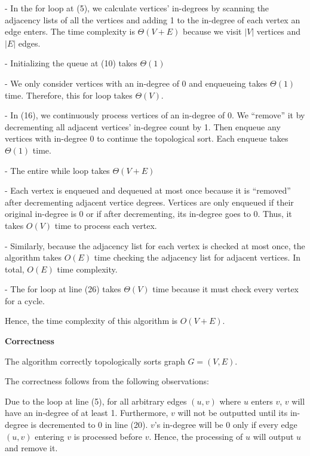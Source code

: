 \documentclass[a4paper]{report}
\begin{document}
\begin{enumerate}
      - In the for loop at (5), we calculate vertices' in-degrees by scanning the adjacency lists of all the vertices and
      adding 1 to the in-degree of each vertex an edge enters. The time complexity is $\Theta(V+E)$ because we visit
      $|V|$ vertices and $|E|$ edges.

      - Initializing the queue at (10) takes $\Theta(1)$

      - We only consider vertices with an in-degree of 0 and enqueueing takes $\Theta(1)$ time. Therefore, this for loop takes
      $\Theta(V)$.

      - In (16), we continuously process vertices of an in-degree of 0. We ``remove'' it by decrementing all adjacent vertices'
      in-degree count by 1. Then enqueue any vertices with in-degree 0 to continue the topological sort. Each enqueue takes
      $\Theta(1)$ time. 

      - The entire while loop takes $\Theta(V+E)$ 
      
        - Each vertex is enqueued and dequeued at most once because it is ``removed'' after decrementing adjacent vertice degrees.
      Vertices are only enqueued if their original in-degree is 0 or if after decrementing, its in-degree goes to 0. Thus, 
      it takes $O(V)$ time to process each vertex.

        - Similarly, because the adjacency list for each vertex is checked at most once, the algorithm takes $O(E)$ time checking
        the adjacency list for adjacent vertices. In total, $O(E)$ time complexity. 

      - The for loop at line (26) takes $\Theta(V)$ time because it must check every vertex for a cycle.

      Hence, the time complexity of this algorithm is $O(V+E)$.

      {\bf Correctness}

      The algorithm correctly topologically sorts graph $G=(V,E)$. 
      
      The correctness follows from the following observations:
      
      Due to the loop at line (5), for all arbitrary edges $(u,v)$ where $u$ enters $v$, $v$ will have an in-degree of at least 1. 
      Furthermore, $v$ will not be outputted until its in-degree is decremented to 0 in line (20). $v$'s in-degree
      will be 0 only if every edge $(u,v)$ entering $v$ is processed before $v$. Hence, the processing of $u$ will 
      output $u$ and remove it. 


\end{enumerate}
\end{document}
